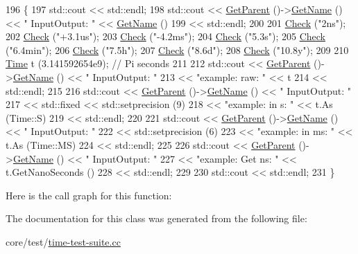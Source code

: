 \begin{DoxyCode}
196 \{
197   std::cout << std::endl;
198   std::cout << \hyperlink{classns3_1_1TestCase_af41db0462b844c9f81838d0e61ecd563}{GetParent} ()->\hyperlink{classns3_1_1TestCase_a28f7bb59669c24dae1c290fc17fc9b62}{GetName} () << \textcolor{stringliteral}{" InputOutput: "} << 
      \hyperlink{classns3_1_1TestCase_a28f7bb59669c24dae1c290fc17fc9b62}{GetName} ()
199             << std::endl;
200   
201   \hyperlink{classTimeInputOutputTestCase_aff6cea5470a7596d9a7db0eef03592f3}{Check} (\textcolor{stringliteral}{"2ns"});
202   \hyperlink{classTimeInputOutputTestCase_aff6cea5470a7596d9a7db0eef03592f3}{Check} (\textcolor{stringliteral}{"+3.1us"});
203   \hyperlink{classTimeInputOutputTestCase_aff6cea5470a7596d9a7db0eef03592f3}{Check} (\textcolor{stringliteral}{"-4.2ms"});
204   \hyperlink{classTimeInputOutputTestCase_aff6cea5470a7596d9a7db0eef03592f3}{Check} (\textcolor{stringliteral}{"5.3s"});
205   \hyperlink{classTimeInputOutputTestCase_aff6cea5470a7596d9a7db0eef03592f3}{Check} (\textcolor{stringliteral}{"6.4min"});
206   \hyperlink{classTimeInputOutputTestCase_aff6cea5470a7596d9a7db0eef03592f3}{Check} (\textcolor{stringliteral}{"7.5h"});
207   \hyperlink{classTimeInputOutputTestCase_aff6cea5470a7596d9a7db0eef03592f3}{Check} (\textcolor{stringliteral}{"8.6d"});
208   \hyperlink{classTimeInputOutputTestCase_aff6cea5470a7596d9a7db0eef03592f3}{Check} (\textcolor{stringliteral}{"10.8y"});
209 
210   \hyperlink{classns3_1_1Time}{Time} t (3.141592654e9);  \textcolor{comment}{// Pi seconds}
211   
212   std::cout << \hyperlink{classns3_1_1TestCase_af41db0462b844c9f81838d0e61ecd563}{GetParent} ()->\hyperlink{classns3_1_1TestCase_a28f7bb59669c24dae1c290fc17fc9b62}{GetName} () << \textcolor{stringliteral}{" InputOutput: "}
213             << \textcolor{stringliteral}{"example: raw:   "} << t
214             << std::endl;
215   
216   std::cout << \hyperlink{classns3_1_1TestCase_af41db0462b844c9f81838d0e61ecd563}{GetParent} ()->\hyperlink{classns3_1_1TestCase_a28f7bb59669c24dae1c290fc17fc9b62}{GetName} () << \textcolor{stringliteral}{" InputOutput: "}
217             << std::fixed << std::setprecision (9)
218             << \textcolor{stringliteral}{"example: in s:  "} << t.As (Time::S)
219             << std::endl;
220     
221   std::cout << \hyperlink{classns3_1_1TestCase_af41db0462b844c9f81838d0e61ecd563}{GetParent} ()->\hyperlink{classns3_1_1TestCase_a28f7bb59669c24dae1c290fc17fc9b62}{GetName} () << \textcolor{stringliteral}{" InputOutput: "}
222             << std::setprecision (6)
223             << \textcolor{stringliteral}{"example: in ms: "} << t.As (Time::MS)
224             << std::endl;
225 
226   std::cout << \hyperlink{classns3_1_1TestCase_af41db0462b844c9f81838d0e61ecd563}{GetParent} ()->\hyperlink{classns3_1_1TestCase_a28f7bb59669c24dae1c290fc17fc9b62}{GetName} () << \textcolor{stringliteral}{" InputOutput: "}
227             << \textcolor{stringliteral}{"example: Get ns: "} << t.GetNanoSeconds ()
228             << std::endl;
229 
230   std::cout << std::endl;
231 \}
\end{DoxyCode}


Here is the call graph for this function\+:




The documentation for this class was generated from the following file\+:\begin{DoxyCompactItemize}
\item 
core/test/\hyperlink{time-test-suite_8cc}{time-\/test-\/suite.\+cc}\end{DoxyCompactItemize}
